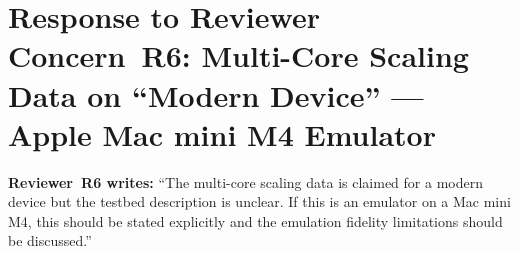 \documentclass[10pt,letterpaper]{article}
\begin{document}
\section{Response to Reviewer Concern~R6: Multi-Core Scaling Data on
``Modern Device'' --- Apple Mac mini M4 Emulator}

\begin{reviewerbox}
\textbf{Reviewer~R6 writes:} ``The multi-core scaling data is claimed for a
modern device but the testbed description is unclear. If this is an emulator
on a Mac mini M4, this should be stated explicitly and the emulation fidelity
limitations should be discussed.''
\end{reviewerbox}
\end{document}
